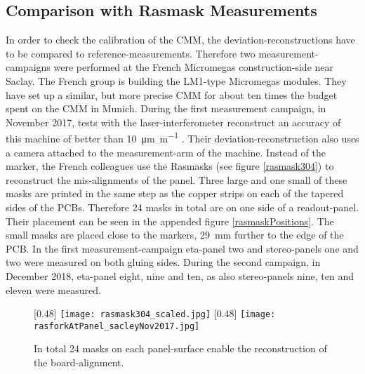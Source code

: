 \documentclass[
twoside,            %
BCOR1.4cm,          %
10pt,               %
headings=normal,    %
headsepline,        %
clearplainpage,		%
final,              %
div=14,
open=right,
bibliography=toc
]{scrreprt}
\begin{document}
\subsection{Comparison with Rasmask Measurements}\label{rasmaskMeasurements}

In order to check the calibration of the CMM, the deviation-reconstructions have to be compared to reference-measurements.
Therefore two measurement-campaigns were performed at the French Micromegas construction-side near Saclay.
The French group is building the LM1-type Micromegas modules.
They have set up a similar, but more precise CMM for about ten times the budget spent on the CMM in Munich.
During the first measurement campaign, in November 2017, tests with the laser-interferometer reconstruct an accuracy of this machine of better than \SI{10}{\micro\m\per\m} \cite{giraudMetrology}.
Their deviation-reconstruction also uses a camera attached to the measurement-arm of the machine.
Instead of the marker, the French colleagues use the Rasmasks (see figure \ref{rasmask304}) to reconstruct the mis-alignments of the panel.
Three large and one small of these masks are printed in the same step as the copper strips on each of the tapered sides of the PCBs.
Therefore 24 masks in total are on one side of a readout-panel.
Their placement can be seen in the appended figure \ref{rasmaskPositions}.
The small masks are placed close to the markers, \SI{29}{mm} further to the edge of the PCB.
In the first measurement-campaign eta-panel two and stereo-panels one and two were measured on both gluing sides.
During the second campaign, in December 2018, eta-panel eight, nine and ten, as also stereo-panels nine, ten and eleven were measured.

\begin{figure}[!h]
	\centering
	[0.48\textwidth]
	{\texttt{[image: rasmask304\_scaled.jpg]}}
	\hfill
	[0.48\textwidth]
	{\texttt{[image: rasforkAtPanel\_sacleyNov2017.jpg]}}
	\vspace{-2mm}
	\caption{
		In total 24 masks on each panel-surface enable the reconstruction of the board-alignment.
	}
\end{figure}
\end{document}
